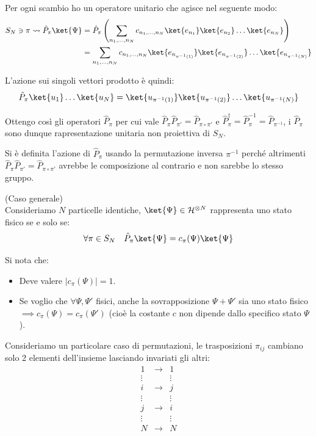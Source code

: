 Per ogni scambio ho un operatore unitario che agisce nel seguente modo:
\begin{align*}
    S_N \ni \pi \rightsquigarrow \hat{P}_{\pi}\ket{\Psi} &=\hat{P}_{\pi} \left( \sum_{n_1, \dots, n_N} c_{n_1, \dots, n_N} \ket{e_{n_1}} \ket{e_{n_2}} \dots \ket{e_{n_N}} \right) \\
    &=\sum_{n_1, \dots, n_N} c_{n_1, \dots, n_N} \ket{e_{n_{\pi^{-1}(1)}}} \ket{e_{n_{\pi^{-1}(2)}}} \dots \ket{e_{n_{\pi^{-1}(N)}}}
\end{align*}

L'azione sui singoli vettori prodotto è quindi:
\[
\hat{P}_{\pi} \ket{u_1} \dots \ket{u_N} = \ket{u_{\pi^{-1}(1)}} \ket{u_{\pi^{-1}(2)}} \dots \ket{u_{\pi^{-1}(N)}}
\]

Ottengo così gli operatori \(\hat{P}_{\pi} \) per cui vale \(\hat{P}_{\pi} \hat{P}_{\pi'}= \hat{P}_{\pi\circ \pi'}\) e \(\hat{P}_{\pi}^\dagger = \hat{P}_{\pi}^{-1}= \hat{P}_{\pi^{-1}} \),
i \(\hat{P}_{\pi} \) sono dunque rapresentazione unitaria non proiettiva di \(S_N\).
\begin{remark}
    Si è definita l'azione di \(\hat{P}_{\pi} \) usando la permutazione inversa \(\pi^{-1}\) perché altrimenti \(\hat{P}_{\pi} \hat{P}_{\pi'}= \hat{P}_{\pi\circ \pi'}\) avrebbe le composizione al contrario e non sarebbe lo stesso gruppo. 
\end{remark}


\begin{postulato9}
    {\normalfont (Caso generale)}\\
    Consideriamo \( N \) particelle identiche, \( \ket{\Psi} \in \mathcal{H}^{\otimes N} \) rappresenta uno stato fisico se e solo se:
    \begin{equation}
        \forall \pi \in S_N \quad \hat{P}_{\pi} \ket{\Psi} = c_{\pi}(\Psi) \ket{\Psi}
    \end{equation}
\end{postulato9}
Si nota che:
\begin{itemize}
        \item Deve valere \( |c_{\pi}(\Psi)| = 1 \).
        \item Se voglio che \( \forall \Psi, \Psi' \) fisici, anche la sovrapposizione \( \Psi + \Psi' \) sia uno stato fisico \( \implies c_{\pi}(\Psi) = c_{\pi}(\Psi') \) (cioè la costante \( c \) non dipende dallo specifico stato \( \Psi \)).
\end{itemize}




Consideriamo un particolare caso di permutazioni, le trasposizioni \(\pi_{ij}\) cambiano solo 2 elementi dell'insieme lasciando invariati gli altri:
\[
\begin{matrix}
1 & \longrightarrow & 1 \\
\vdots & & \vdots \\
i & \longrightarrow & j \\
\vdots & & \vdots \\
j & \longrightarrow & i \\
\vdots & & \vdots \\
N & \longrightarrow & N
\end{matrix}
\]

